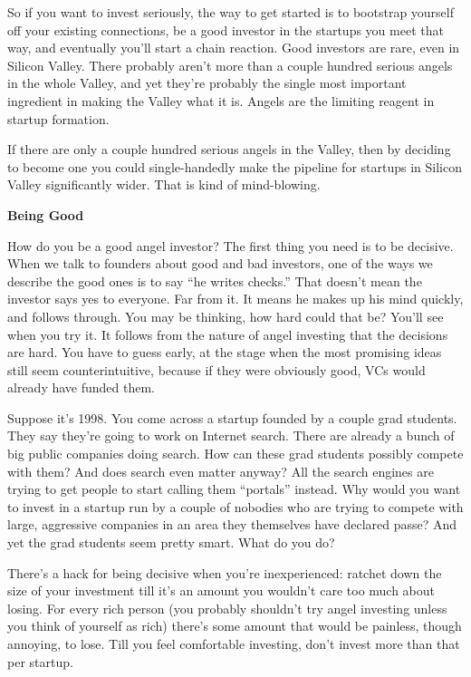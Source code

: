 So if you want to invest seriously, the way to get started is to
bootstrap yourself off your existing connections, be a good investor in
the startups you meet that way, and eventually you'll start a chain
reaction. Good investors are rare, even in Silicon Valley. There
probably aren't more than a couple hundred serious angels in the whole
Valley, and yet they're probably the single most important ingredient in
making the Valley what it is. Angels are the limiting reagent in startup
formation.

If there are only a couple hundred serious angels in the Valley, then by
deciding to become one you could single-handedly make the pipeline for
startups in Silicon Valley significantly wider. That is kind of
mind-blowing.

\textbf{Being Good}

How do you be a good angel investor? The first thing you need is to be
decisive. When we talk to founders about good and bad investors, one of
the ways we describe the good ones is to say ``he writes checks.'' That
doesn't mean the investor says yes to everyone. Far from it. It means he
makes up his mind quickly, and follows through. You may be thinking, how
hard could that be? You'll see when you try it. It follows from the
nature of angel investing that the decisions are hard. You have to guess
early, at the stage when the most promising ideas still seem
counterintuitive, because if they were obviously good, VCs would already
have funded them.

Suppose it's 1998. You come across a startup founded by a couple grad
students. They say they're going to work on Internet search. There are
already a bunch of big public companies doing search. How can these grad
students possibly compete with them? And does search even matter anyway?
All the search engines are trying to get people to start calling them
``portals'' instead. Why would you want to invest in a startup run by a
couple of nobodies who are trying to compete with large, aggressive
companies in an area they themselves have declared passe? And yet the
grad students seem pretty smart. What do you do?

There's a hack for being decisive when you're inexperienced: ratchet
down the size of your investment till it's an amount you wouldn't care
too much about losing. For every rich person (you probably shouldn't try
angel investing unless you think of yourself as rich) there's some
amount that would be painless, though annoying, to lose. Till you feel
comfortable investing, don't invest more than that per startup.

